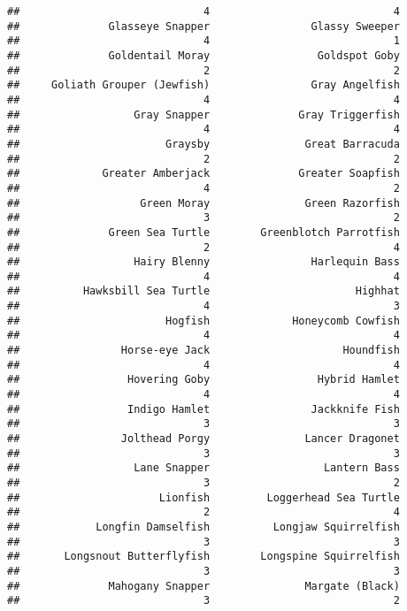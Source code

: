 \documentclass[
]{article}
\begin{document}
\begin{verbatim}
##                             4                             4 
##              Glasseye Snapper                Glassy Sweeper 
##                             4                             1 
##              Goldentail Moray                 Goldspot Goby 
##                             2                             2 
##     Goliath Grouper (Jewfish)                Gray Angelfish 
##                             4                             4 
##                  Gray Snapper              Gray Triggerfish 
##                             4                             4 
##                       Graysby               Great Barracuda 
##                             2                             2 
##             Greater Amberjack              Greater Soapfish 
##                             4                             2 
##                   Green Moray               Green Razorfish 
##                             3                             2 
##              Green Sea Turtle        Greenblotch Parrotfish 
##                             2                             4 
##                  Hairy Blenny                Harlequin Bass 
##                             4                             4 
##          Hawksbill Sea Turtle                       Highhat 
##                             4                             3 
##                       Hogfish             Honeycomb Cowfish 
##                             4                             4 
##                Horse-eye Jack                     Houndfish 
##                             4                             4 
##                 Hovering Goby                 Hybrid Hamlet 
##                             4                             4 
##                 Indigo Hamlet                Jackknife Fish 
##                             3                             3 
##                Jolthead Porgy               Lancer Dragonet 
##                             3                             3 
##                  Lane Snapper                  Lantern Bass 
##                             3                             2 
##                      Lionfish         Loggerhead Sea Turtle 
##                             2                             4 
##            Longfin Damselfish          Longjaw Squirrelfish 
##                             3                             3 
##       Longsnout Butterflyfish        Longspine Squirrelfish 
##                             3                             3 
##              Mahogany Snapper               Margate (Black) 
##                             3                             2 

\end{verbatim}
\end{document}

